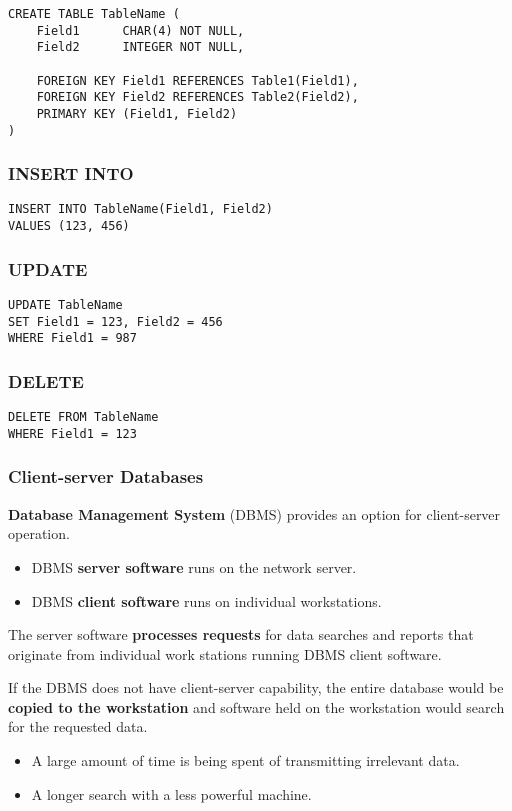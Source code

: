 \begin{verbatim}
CREATE TABLE TableName (
    Field1      CHAR(4) NOT NULL,
    Field2      INTEGER NOT NULL,

    FOREIGN KEY Field1 REFERENCES Table1(Field1),
    FOREIGN KEY Field2 REFERENCES Table2(Field2),
    PRIMARY KEY (Field1, Field2)
)
\end{verbatim}

\subsubsection*{INSERT INTO}
\begin{verbatim}
INSERT INTO TableName(Field1, Field2)
VALUES (123, 456)
\end{verbatim}

\subsubsection*{UPDATE}
\begin{verbatim}
UPDATE TableName
SET Field1 = 123, Field2 = 456
WHERE Field1 = 987
\end{verbatim}

\subsubsection*{DELETE}
\begin{verbatim}
DELETE FROM TableName
WHERE Field1 = 123
\end{verbatim}

\subsubsection*{Client-server Databases}

\textbf{Database Management System} (DBMS) provides an option for client-server operation.
\begin{itemize}
    \item DBMS \textbf{server software} runs on the network server.
    \item DBMS \textbf{client software} runs on individual workstations.
\end{itemize}

The server software \textbf{processes requests} for data searches and reports that originate from individual work stations running DBMS client software.

If the DBMS does not have client-server capability, the entire database would be \textbf{copied to the workstation} and software held on the workstation would search for the requested data.
\begin{itemize}
    \item A large amount of time is being spent of transmitting irrelevant data.
    \item A longer search with a less powerful machine.
\end{itemize}

